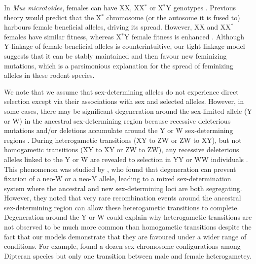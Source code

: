 \documentclass[12pt]{article}
\begin{document}
In \textit{Mus microtoides}, females can have XX, XX$^\ast$ or X$^\ast$Y genotypes \citep{Veyrunes2010}. 
Previous theory would predict that the X$^\ast$ chromosome (or the autosome it is fused to) harbours female beneficial alleles, driving its spread. 
However, XX and XX$^\ast$ females have similar fitness, whereas X$^\ast$Y female fitness is enhanced \citep{Saunders2014}.
Although Y-linkage of female-beneficial alleles is counterintuitive, our tight linkage model suggests that it can be stably maintained and then favour new feminizing mutations, which is a parsimonious explanation for the spread of feminizing alleles in these rodent species. 

We note that we assume that sex-determining alleles do not experience direct selection except via their associations with sex and selected alleles.
However, in some cases, there may be significant degeneration around the sex-limited allele (Y or W) in the ancestral sex-determining region because recessive deleterious mutations and/or deletions accumulate around the Y or W sex-determining regions \citep{Rice:1996ke,Charlesworth:2000cc,Bachtrog:2006ed,Marais:2008hm}. 
During heterogametic transitions (XY to ZW or ZW to XY), but not homogametic transitions (XY to XY or ZW to ZW), any recessive deleterious alleles linked to the Y or W are revealed to selection in YY or WW individuals \citep{Bachtrog:2014bx}. 
This phenomenon was studied by \citet{vanDoorn:2010hu}, who found that degeneration can prevent fixation of a neo-W or a neo-Y allele, leading to a mixed sex-determination system where the ancestral and new sex-determining loci are both segregating. 
However, they noted that very rare recombination events around the ancestral sex-determining region can allow these heterogametic transitions to complete.  
Degeneration around the Y or W could explain why heterogametic transitions are not observed to be much more common than homogametic transitions despite the fact that our models demonstrate that they are favoured under a wider range of conditions. 
For example, \citet{Vicoso:2015hf} found a dozen sex chromosome configurations among Dipteran species but only one transition between male and female heterogametey. 
\end{document}
